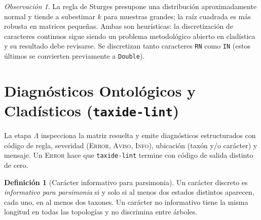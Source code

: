 \documentclass[11pt,a4paper]{article}
\theoremstyle{definition}
\newtheorem{definicion}{Definición}[section]
\theoremstyle{remark}
\newtheorem*{observacion}{Observación}
\begin{document}
\begin{observacion}
La regla de Sturges presupone una distribución aproximadamente normal y tiende a subestimar $k$ para muestras grandes; la raíz cuadrada es más robusta en matrices pequeñas. Ambas son heurísticas: la discretización de caracteres continuos sigue siendo un problema metodológico abierto en cladística y su resultado debe revisarse. Se discretizan tanto caracteres \texttt{RN} como \texttt{IN} (estos últimos se convierten previamente a \texttt{Double}).
\end{observacion}

\section{Diagnósticos Ontológicos y Cladísticos (\texttt{taxide-lint})}
\label{sec:linter}

La etapa $\Lambda$ inspecciona la matriz resuelta y emite diagnósticos estructurados con código de regla, severidad (\textsc{Error}, \textsc{Aviso}, \textsc{Info}), ubicación (taxón y/o carácter) y mensaje. Un \textsc{Error} hace que \texttt{taxide-lint} termine con código de salida distinto de cero.

\begin{definicion}[Carácter informativo para parsimonia]
\label{def:informativo}
Un carácter discreto es \emph{informativo para parsimonia} si y solo si al menos dos estados distintos aparecen, cada uno, en al menos dos taxones. Un carácter no informativo tiene la misma longitud en todas las topologías y no discrimina entre árboles.
\end{definicion}
\end{document}
